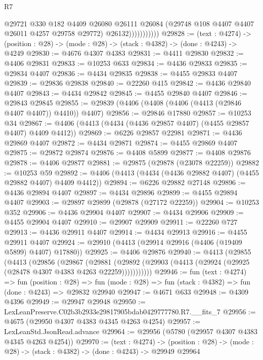 \begin{lexlean}{R7}
\begin{coremodule}
                        @29721
                          @330
                          @182
                          @4409
                          @26080
                          @26111
                          @26084
                          (@29748 @108 @4407 @4407 @26011 @4257 @29758 @29772)
                          @26132)))))))))))
@29828 := (text : @4274) ->
  (position : @28) -> (mode : @28) -> (stack : @4382) -> (done : @4243) -> @4249
@29830 := @4676 @4307 @4383
@29831 := @4411 @29830
@29832 := @4406 @29831
@29833 := @10253 @633
@29834 := @4436 @29833
@29835 := @29834 @4407
@29836 := @4434 @29835
@29838 := @4455 @29833 @4407
@29839 := @29836 @29838
@29840 := @22260 @415
@29842 := @4436 @29840 @4407
@29843 := @4434 @29842
@29845 := @4455 @29840 @4407
@29846 := @29843 @29845
@29855 := @29839 (@4406 (@4408 (@4406 (@4413 (@29846 @4407 @4407)) @4410)) @4407)
@29856 := @29846 @17880
@29857 := @10253 @34
@29867 := @4406 (@4413 (@4434 (@4436 @29857 @4407) (@4455 @29857 @4407) @4409 @4412))
@29869 := @6226 @29857 @22981
@29871 := @4436 @29869 @4407
@29872 := @4434 @29871
@29874 := @4455 @29869 @4407
@29875 := @29872 @29874
@29876 := @4408 @5899
@29877 := @4408 @29876
@29878 := @4406 @29877
@29881 := @29875 (@29878 (@23078 @22259))
@29882 := @10253 @59
@29892 := @4406 (@4413 (@4434 (@4436 @29882 @4407) (@4455 @29882 @4407) @4409 @4412))
@29894 := @6226 @29882 @27148
@29896 := @4436 @29894 @4407
@29897 := @4434 @29896
@29899 := @4455 @29894 @4407
@29903 := @29897 @29899 (@29878 (@27172 @22259))
@29904 := @10253 @352
@29906 := @4436 @29904 @4407
@29907 := @4434 @29906
@29909 := @4455 @29904 @4407
@29910 := @29907 @29909
@29911 := @22260 @727
@29913 := @4436 @29911 @4407
@29914 := @4434 @29913
@29916 := @4455 @29911 @4407
@29924 := @29910 (@4413 (@29914 @29916 (@4406 (@19409 @5899) @4407) @17880))
@29925 := @4406 @29876
@29940 := @4413
    (@29855
      (@4413
        (@29856
          (@29867
            (@29881
              (@29892 (@29903 (@4413 (@29924 (@29925 (@28478 @4307 @4383 @4263 @22259)))))))))))
@29946 := fun (text : @4274) =>
  fun (position : @28) =>
  fun (mode : @28) => fun (stack : @4382) => fun (done : @4243) => @29832 @29940
@29947 := @4671 @633
@29948 := @4309 @4396
@29949 := @29947 @29948
@29950 := LexLeanPreserve.C02b3b2933e29817905bdab0429777780.R7.__fits_7
@29956 := @4675 (@29950 @4307 @4383 @4345 @4263 @4254)
@29957 := LexLeanStd.JsonRead.advance
@29964 := @29956 (@5780 (@29957 @4307 @4383 @4345 @4263 @4254))
@29970 := (text : @4274) ->
  (position : @28) -> (mode : @28) -> (stack : @4382) -> (done : @4243) -> @29949 @29964

\end{coremodule}
\end{lexlean}

